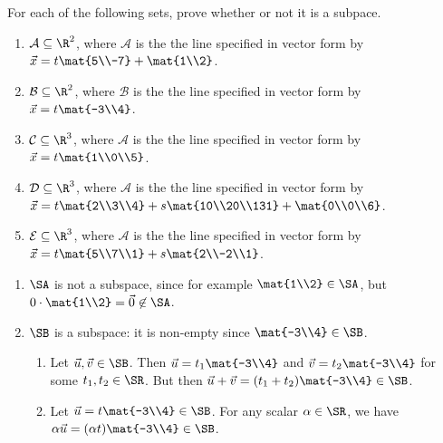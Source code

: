 \begin{exercises}
\begin{problist}
		\prob For each of the following sets, prove whether or not it is a subpace.
		\begin{enumerate}
			\item $\mathcal A \subseteq \R^2$, where $\mathcal A$ is the the line specified in vector form by
			$\vec x = t\mat{5\\-7}+\mat{1\\2}$.
			\item $\mathcal B \subseteq \R^2$, where $\mathcal B$ is  the the line specified  in vector form by
			$\vec x = t\mat{-3\\4}$.
			\item $\mathcal C \subseteq \R^3$, where $\mathcal A$ is  the the line specified  in vector form by
			$\vec x = t\mat{1\\0\\5}$.
			\item $\mathcal D \subseteq \R^3$, where $\mathcal A$ is  the the line specified  in vector form by
			$\vec x = t\mat{2\\3\\4}+s\mat{10\\20\\131}+\mat{0\\0\\6}$.
			\item $\mathcal E \subseteq \R^3$, where $\mathcal A$ is  the the line specified  in vector form by
			$\vec x = t\mat{5\\7\\1}+s\mat{2\\-2\\1}$.
		\end{enumerate}
		\begin{solution}
			\begin{enumerate}
				\item $\SA$ is not a subspace, since for example $\mat{1\\2}\in\SA$, but $0\cdot\mat{1\\2}=\vec 0\not\in\SA$.

				\item $\SB$ is a subspace: it is non-empty since $\mat{-3\\4}\in\SB$. 
				\begin{enumerate}
					\item Let $\vec u,\vec v\in \SB$. Then $\vec u=t_1\mat{-3\\4}$ and $\vec v=t_2\mat{-3\\4}$ for some $t_1,t_2\in\SR$. But then $\vec u+\vec v=(t_1+t_2)\mat{-3\\4}\in \SB$.
					\item Let $\vec u=t\mat{-3\\4}\in\SB$. For any scalar $\alpha\in\SR$, we have $\alpha\vec u=(\alpha t)\mat{-3\\4}\in\SB$.
				\end{enumerate}


\end{enumerate}
\end{solution}
\end{problist}
\end{exercises}
